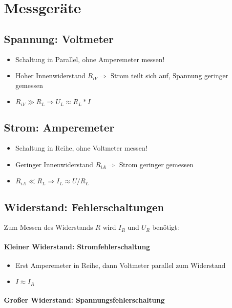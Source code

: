 \section{Messgeräte}

\subsection{Spannung: Voltmeter}

\begin{itemize}
  \item Schaltung in Parallel, ohne Amperemeter messen!
  \item Hoher Innenwiderstand $R_{iV} \Rightarrow$ Strom teilt sich auf, Spannung geringer gemessen
  \item $R_{iV} \gg R_L \Rightarrow U_L \approx R_L * I$
\end{itemize}

\subsection{Strom: Amperemeter}

\begin{itemize}
  \item Schaltung in Reihe, ohne Voltmeter messen!
  \item Geringer Innenwiderstand $R_{iA} \Rightarrow$ Strom geringer gemessen
  \item $R_{iA} \ll R_L \Rightarrow I_L \approx U/R_L$
\end{itemize}

\subsection{Widerstand: Fehlerschaltungen}

Zum Messen des Widerstands $R$ wird $I_R$ und $U_R$ benötigt:

\paragraph{Kleiner Widerstand: Stromfehlerschaltung}

\begin{itemize}
  \item Erst Amperemeter in Reihe, dann Voltmeter parallel zum Widerstand
  \item $I \approx I_R$
\end{itemize}

\paragraph{Gro\ss er Widerstand: Spannungsfehlerschaltung}


